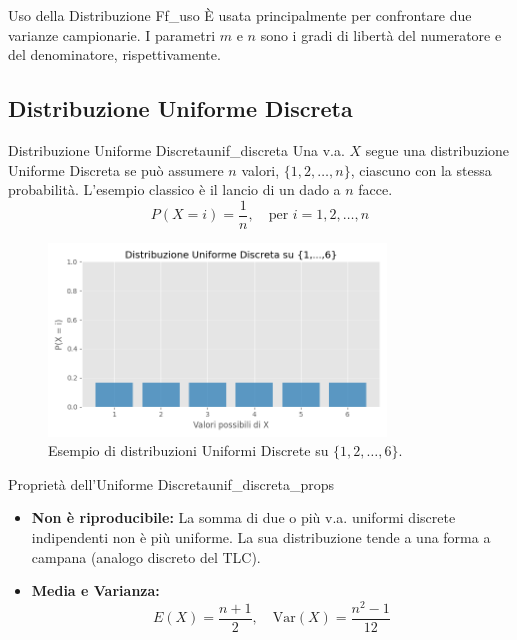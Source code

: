 \begin{nota}{Uso della Distribuzione F}{f_uso}
È usata principalmente per confrontare due varianze campionarie. I parametri \(m\) e \(n\) sono i gradi di libertà del numeratore e del denominatore, rispettivamente.
\end{nota}

\subsection{Distribuzione Uniforme Discreta}

\begin{definizione}{Distribuzione Uniforme Discreta}{unif_discreta}
Una v.a. \(X\) segue una distribuzione Uniforme Discreta se può assumere \(n\) valori, \(\{1, 2, \dots, n\}\), ciascuno con la stessa probabilità. L'esempio classico è il lancio di un dado a \(n\) facce.
\[
P(X = i) = \frac{1}{n}, \quad \text{per } i=1, 2, \dots, n
\]
\end{definizione}

\begin{figure}[H]
    \centering
    \includegraphics[width=0.8\textwidth]{images/uniforme_discreta.png}
    \caption{Esempio di distribuzioni Uniformi Discrete su \(\{1, 2, \dots, 6\}\).}
    \label{fig:uniforme_discreta}
\end{figure}

\begin{proposizione}{Proprietà dell'Uniforme Discreta}{unif_discreta_props}
\begin{itemize}
    \item \textbf{Non è riproducibile:} La somma di due o più v.a. uniformi discrete indipendenti non è più uniforme. La sua distribuzione tende a una forma a campana (analogo discreto del TLC).
    \item \textbf{Media e Varianza:}
    \[ E(X) = \frac{n+1}{2}, \quad \text{Var}(X) = \frac{n^2-1}{12} \]
\end{itemize}
\end{proposizione}

